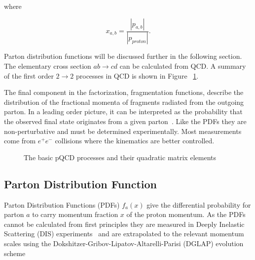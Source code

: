 \noindent where 

\begin{equation}
x_{a,b} = \frac{\left| p_{a,b} \right|}{\left| p_{proton} \right|}.
\end{equation}


Parton distribution functions will be discussed further in the following section. The elementary cross section $ab\rightarrow cd$ can be calculated from QCD. A summary of the first order $2\rightarrow2$ processes in QCD is shown in Figure ~\ref{fig:qcdlo}. 

The final component in the factorization, fragmentation functions, describe the distribution of the fractional momenta of fragments radiated from the outgoing parton.  In a leading order picture, it can be interpreted as the probability that the observed final state originates from a given parton~\cite{Metz:2016swz}. Like the PDFs they are non-perturbative and must be determined experimentally. Most measurements come from $e^+ e^-$ collisions where the kinematics are better controlled. 


%



\begin{figure}[tb]
\centering

\caption[QCD Leading Order]{The basic pQCD processes and their quadratic matrix elements}
\label{fig:qcdlo}
\end{figure}



\subsection*{Parton Distribution Function}
Parton Distribution Functions (PDFs) $f_a\left(x\right)$ give the differential probability for parton $a$ to carry momentum fraction $x$ of the proton momentum. %
As the PDFs cannot be calculated from first principles they are measured in Deeply Inelastic Scattering (DIS) experiments~\cite{Placakyte:2011az} and are extrapolated to the relevant momentum scales using the Dokshitzer-Gribov-Lipatov-Altarelli-Parisi (DGLAP) evolution scheme ~\cite{Gribov:1972ri,Altarelli:1977zs,Dokshitzer:1977sg}  %

